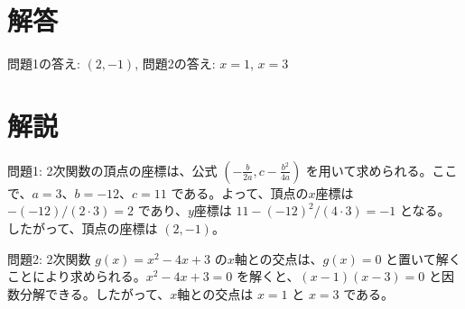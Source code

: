\documentclass[a4paper,11pt]{article}
\numberwithin{equation}{section}
\theoremstyle{definition}
\theoremstyle{remark}
\begin{document}
\section*{解答}

問題1の答え: $(2, -1)$, 問題2の答え: $x = 1$, $x = 3$

\section*{解説}

問題1: 2次関数の頂点の座標は、公式 $\left(-\frac{b}{2a}, c - \frac{b^2}{4a}\right)$ を用いて求められる。ここで、$a = 3$、$b = -12$、$c = 11$ である。よって、頂点の$x$座標は $-\left(-12\right)/\left(2\cdot3\right) = 2$ であり、$y$座標は $11 - \left(-12\right)^2/\left(4\cdot3\right) = -1$ となる。したがって、頂点の座標は $(2, -1)$。

問題2: 2次関数 $g(x) = x^2 - 4x + 3$ の$x$軸との交点は、$g(x) = 0$ と置いて解くことにより求められる。$x^2 - 4x + 3 = 0$ を解くと、$(x - 1)(x - 3) = 0$ と因数分解できる。したがって、$x$軸との交点は $x = 1$ と $x = 3$ である。
\end{document}
